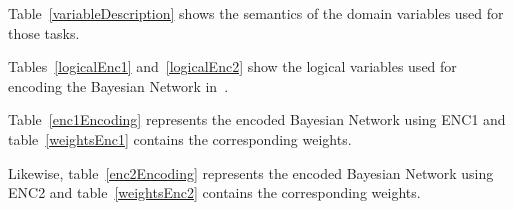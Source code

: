 Table~\ref{variableDescription} shows the semantics of the domain variables used for those tasks.


Tables~\ref{logicalEnc1} and~\ref{logicalEnc2} show the logical variables used for encoding the Bayesian Network in~\cite{bayesian_network}.



Table~\ref{enc1Encoding} represents the encoded Bayesian Network using ENC1 and table~\ref{weightsEnc1} contains the corresponding weights.
%



Likewise, table~\ref{enc2Encoding} represents the encoded Bayesian Network using ENC2 and table~\ref{weightsEnc2} contains the corresponding weights.
%

